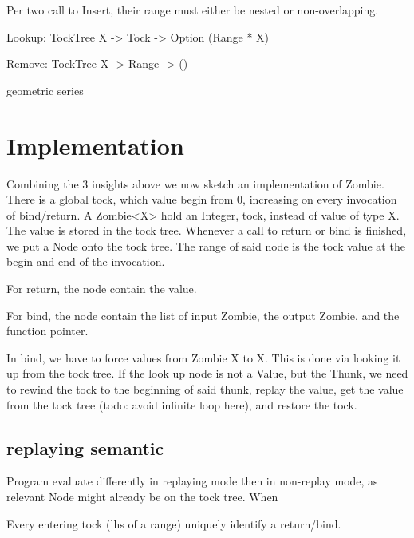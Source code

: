 \documentclass[acmsmall]{acmart}
\begin{document}
	Per two call to Insert, their range must either be nested or non-overlapping.

	Lookup: TockTree X -> Tock -> Option (Range * X)

	Remove: TockTree X -> Range -> ()
	
	geometric series

	\section{Implementation}
	Combining the 3 insights above we now sketch an implementation of Zombie.
	There is a global tock, which value begin from 0, increasing on every invocation of bind/return.
	A Zombie<X> hold an Integer, tock, instead of value of type X.
	The value is stored in the tock tree.
	Whenever a call to return or bind is finished, we put a Node onto the tock tree.
	The range of said node is the tock value at the begin and end of the invocation.
	
	For return, the node contain the value.
	
	For bind, the node contain the list of input Zombie, the output Zombie, and the function pointer.
	
	In bind, we have to force values from Zombie X to X. This is done via looking it up from the tock tree. If the look up node is not a Value, but the Thunk, we need to rewind the tock to the beginning of said thunk, replay the value, get the value from the tock tree (todo: avoid infinite loop here), and restore the tock.
	
	\subsection{replaying semantic}
	Program evaluate differently in replaying mode then in non-replay mode, as relevant Node might already be on the tock tree. When 
	
	Every entering tock (lhs of a range) uniquely identify a return/bind.
	
\end{document}
